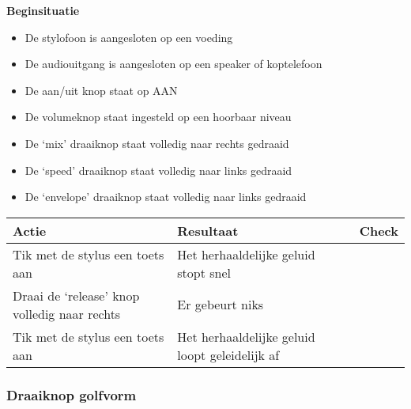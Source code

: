 \documentclass[12pt, a4paper, dutch]{article}
\newcommand{\cb}{\Square}
\newcommand{\stroom}{De stylofoon is aangesloten op een voeding}
\newcommand{\audio}{De audiouitgang is aangesloten op een speaker of koptelefoon}
\newcommand{\aan}{De aan/uit knop staat op AAN}
\newcommand{\vol}{De volumeknop staat ingesteld op een hoorbaar niveau}
\begin{document}
\begin{minipage}{\textwidth}
\textbf{Beginsituatie}
\begin{itemize}
	\item \stroom
	\item \audio
	\item \aan
	\item \vol
	\item De `mix' draaiknop staat volledig naar rechts gedraaid
	\item De `speed' draaiknop staat volledig naar links gedraaid
	\item De `envelope' draaiknop staat volledig naar links gedraaid
\end{itemize}

\medskip

\begin{tabularx}{\textwidth}{p{}p{}>{\raggedleft\arraybackslash}X}
\toprule
\textbf{Actie} & \textbf{Resultaat} & \textbf{Check}\\
\midrule
Tik met de stylus een toets aan &
Het herhaaldelijke geluid stopt snel &
\cb\\

Draai de `release' knop volledig naar rechts &
Er gebeurt niks &
\cb\\

Tik met de stylus een toets aan &
Het herhaaldelijke geluid loopt geleidelijk af &
\cb\\
\bottomrule
\end{tabularx}
\end{minipage}

\subsubsection{Draaiknop golfvorm}
\end{document}
